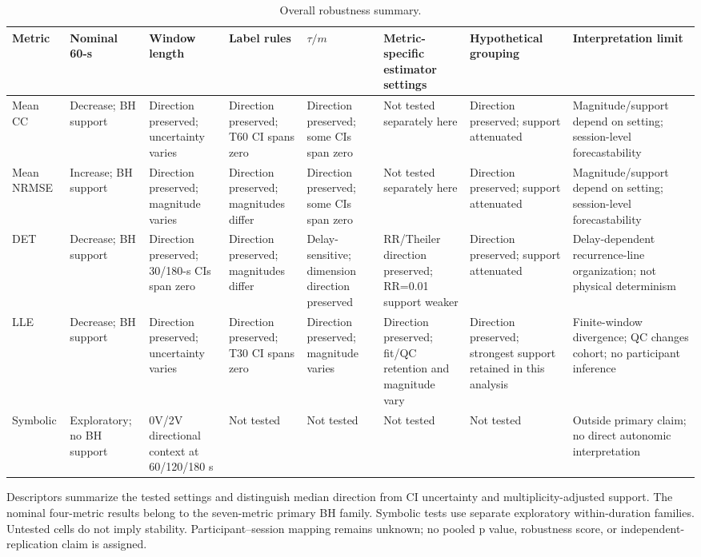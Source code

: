 \begin{table}[p]
\centering
\scriptsize
\setlength{\tabcolsep}{3pt}
\renewcommand{\arraystretch}{1.12}
\caption{Overall robustness summary.}
\label{tab:supp_summary}
\begin{tabular}{p{}p{}p{}p{}p{}p{}p{}p{}}
\toprule
Metric & Nominal 60-s & Window length & Label rules & $\tau/m$ & Metric-specific estimator settings & Hypothetical grouping & Interpretation limit \\
\midrule
Mean CC & Decrease; BH support & Direction preserved; uncertainty varies & Direction preserved; T60 CI spans zero & Direction preserved; some CIs span zero & Not tested separately here & Direction preserved; support attenuated & Magnitude/support depend on setting; session-level forecastability \\
Mean NRMSE & Increase; BH support & Direction preserved; magnitude varies & Direction preserved; magnitudes differ & Direction preserved; some CIs span zero & Not tested separately here & Direction preserved; support attenuated & Magnitude/support depend on setting; session-level forecastability \\
DET & Decrease; BH support & Direction preserved; 30/180-s CIs span zero & Direction preserved; magnitudes differ & Delay-sensitive; dimension direction preserved & RR/Theiler direction preserved; RR=0.01 support weaker & Direction preserved; support attenuated & Delay-dependent recurrence-line organization; not physical determinism \\
LLE & Decrease; BH support & Direction preserved; uncertainty varies & Direction preserved; T30 CI spans zero & Direction preserved; magnitude varies & Direction preserved; fit/QC retention and magnitude vary & Direction preserved; strongest support retained in this analysis & Finite-window divergence; QC changes cohort; no participant inference \\
Symbolic & Exploratory; no BH support & 0V/2V directional context at 60/120/180 s & Not tested & Not tested & Not tested & Not tested & Outside primary claim; no direct autonomic interpretation \\
\bottomrule
\end{tabular}
\par\medskip
\begin{minipage}{\textwidth}\footnotesize
Descriptors summarize the tested settings and distinguish median direction from CI uncertainty and multiplicity-adjusted support. The nominal four-metric results belong to the seven-metric primary BH family. Symbolic tests use separate exploratory within-duration families. Untested cells do not imply stability. Participant--session mapping remains unknown; no pooled p value, robustness score, or independent-replication claim is assigned.
\end{minipage}
\end{table}
\endgroup
